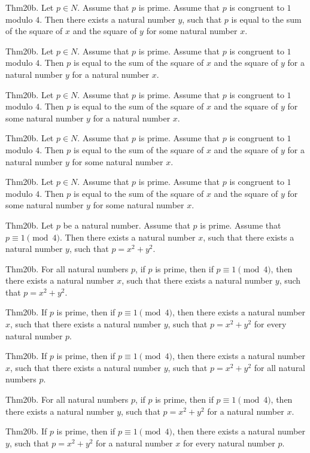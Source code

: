 \documentclass{article}
\begin{document}
Thm20b. Let $p \in N$. Assume that $p$ is prime. Assume that $p$ is congruent to $1$ modulo $4$. Then there exists a natural number $y$, such that $p$ is equal to the sum of the square of $x$ and the square of $y$ for some natural number $x$.

Thm20b. Let $p \in N$. Assume that $p$ is prime. Assume that $p$ is congruent to $1$ modulo $4$. Then $p$ is equal to the sum of the square of $x$ and the square of $y$ for a natural number $y$ for a natural number $x$.

Thm20b. Let $p \in N$. Assume that $p$ is prime. Assume that $p$ is congruent to $1$ modulo $4$. Then $p$ is equal to the sum of the square of $x$ and the square of $y$ for some natural number $y$ for a natural number $x$.

Thm20b. Let $p \in N$. Assume that $p$ is prime. Assume that $p$ is congruent to $1$ modulo $4$. Then $p$ is equal to the sum of the square of $x$ and the square of $y$ for a natural number $y$ for some natural number $x$.

Thm20b. Let $p \in N$. Assume that $p$ is prime. Assume that $p$ is congruent to $1$ modulo $4$. Then $p$ is equal to the sum of the square of $x$ and the square of $y$ for some natural number $y$ for some natural number $x$.

Thm20b. Let $p$ be a natural number. Assume that $p$ is prime. Assume that $p \equiv 1 \pmod{ 4}$. Then there exists a natural number $x$, such that there exists a natural number $y$, such that $p = x ^{ 2}+ y ^{ 2}$.

Thm20b. For all natural numbers $p$, if $p$ is prime, then if $p \equiv 1 \pmod{ 4}$, then there exists a natural number $x$, such that there exists a natural number $y$, such that $p = x ^{ 2}+ y ^{ 2}$.

Thm20b. If $p$ is prime, then if $p \equiv 1 \pmod{ 4}$, then there exists a natural number $x$, such that there exists a natural number $y$, such that $p = x ^{ 2}+ y ^{ 2}$ for every natural number $p$.

Thm20b. If $p$ is prime, then if $p \equiv 1 \pmod{ 4}$, then there exists a natural number $x$, such that there exists a natural number $y$, such that $p = x ^{ 2}+ y ^{ 2}$ for all natural numbers $p$.

Thm20b. For all natural numbers $p$, if $p$ is prime, then if $p \equiv 1 \pmod{ 4}$, then there exists a natural number $y$, such that $p = x ^{ 2}+ y ^{ 2}$ for a natural number $x$.

Thm20b. If $p$ is prime, then if $p \equiv 1 \pmod{ 4}$, then there exists a natural number $y$, such that $p = x ^{ 2}+ y ^{ 2}$ for a natural number $x$ for every natural number $p$.
\end{document}
